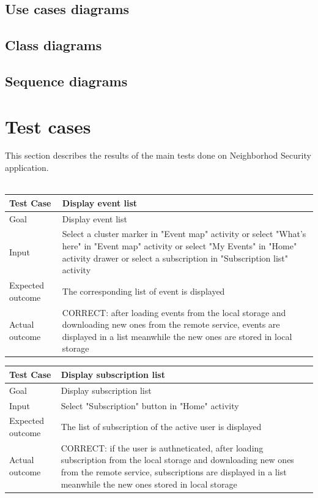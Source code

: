 \documentclass[a4paper]{scrreprt}
\begin{document}
\section{Use cases diagrams}

\section{Class diagrams}

\section{Sequence diagrams}


\chapter{Test cases}
This section describes the results of the main tests done on Neighborhod Security application.\\\\
\bigskip
\noindent
\begin{tabularx}{\linewidth}{|l|X|}
	\hline
	\textbf{Test Case} 	& \textbf{Display event list} \\ \hline
	Goal 				& Display event list \\ \hline
	Input 				& Select a cluster marker in  "Event map" activity or select "What's here" in  "Event map" activity or select "My Events" in "Home" activity drawer or select a subscription in "Subscription list" activity \\ \hline
	Expected outcome 	& The corresponding list of event is displayed \\ \hline
	Actual outcome 		& CORRECT: after loading events from the local storage and downloading new ones from the remote service, events are displayed in a list meanwhile the new ones are stored in local storage \\ \hline
\end{tabularx}
\bigskip
\noindent
\begin{tabularx}{\linewidth}{|l|X|}
	\hline
	\textbf{Test Case} 	& \textbf{Display subscription list} \\ \hline
	Goal 				& Display subscription list \\ \hline
	Input 				& Select "Subscription" button in "Home" activity \\ \hline
	Expected outcome 	& The list of subscription of the active user is displayed \\ \hline
	Actual outcome 		& CORRECT: if the user is authneticated, after loading subscription from the local storage and downloading new ones from the remote service, subscriptions are displayed in a list meanwhile the new ones stored in local storage \\ \hline
\end{tabularx}
\end{document}
